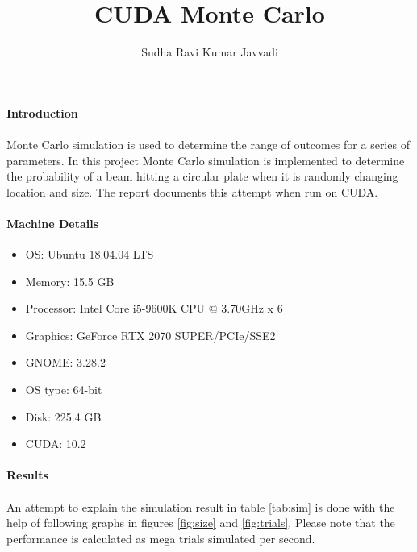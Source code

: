 \documentclass[notitlepage]{report}
\title{CUDA Monte Carlo}
\author{Sudha Ravi Kumar Javvadi}
\begin{document}
	\maketitle
	
	\paragraph{Introduction}
	\paragraph{} Monte Carlo simulation is used to determine the range of outcomes for a series of parameters. In this project Monte Carlo simulation is implemented to determine the probability of a beam hitting a circular plate when it is randomly changing location and size. The report documents this attempt when run on CUDA.
	
	\paragraph{Machine Details}
	\begin{itemize}
		\item{OS}: Ubuntu 18.04.04 LTS
		\item{Memory}: 15.5 GB
		\item{Processor}: Intel Core i5-9600K CPU @ 3.70GHz x 6
		\item{Graphics}: GeForce RTX 2070 SUPER/PCIe/SSE2
		\item{GNOME}: 3.28.2
		\item{OS type}: 64-bit
		\item{Disk}: 225.4 GB
		\item{CUDA}: 10.2
	\end{itemize}

	\paragraph{Results}
	\paragraph{}
	An attempt to explain the simulation result in table \ref{tab:sim} is done with the help of following graphs in figures \ref{fig:size} and \ref{fig:trials}. Please note that the performance is calculated as mega trials simulated per second.
	
\end{document}
